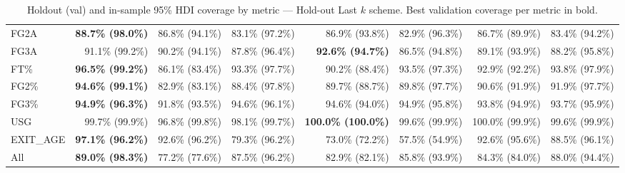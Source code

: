 \begin{table}[H]
{\begin{tabular}{lrrrrrrr}
FG2A & \textbf{88.7\% (98.0\%)} & 86.8\% (94.1\%) & 83.1\% (97.2\%) & 86.9\% (93.8\%) & 82.9\% (96.3\%) & 86.7\% (89.9\%) & 83.4\% (94.2\%) \\
FG3A & 91.1\% (99.2\%) & 90.2\% (94.1\%) & 87.8\% (96.4\%) & \textbf{92.6\% (94.7\%)} & 86.5\% (94.8\%) & 89.1\% (93.9\%) & 88.2\% (95.8\%) \\
FT\% & \textbf{96.5\% (99.2\%)} & 86.1\% (83.4\%) & 93.3\% (97.7\%) & 90.2\% (88.4\%) & 93.5\% (97.3\%) & 92.9\% (92.2\%) & 93.8\% (97.9\%) \\
FG2\% & \textbf{94.6\% (99.1\%)} & 82.9\% (83.1\%) & 88.4\% (97.8\%) & 89.7\% (88.7\%) & 89.8\% (97.7\%) & 90.6\% (91.9\%) & 91.9\% (97.7\%) \\
FG3\% & \textbf{94.9\% (96.3\%)} & 91.8\% (93.5\%) & 94.6\% (96.1\%) & 94.6\% (94.0\%) & 94.9\% (95.8\%) & 93.8\% (94.9\%) & 93.7\% (95.9\%) \\
USG & 99.7\% (99.9\%) & 96.8\% (99.8\%) & 98.1\% (99.7\%) & \textbf{100.0\% (100.0\%)} & 99.6\% (99.9\%) & 100.0\% (99.9\%) & 99.6\% (99.9\%) \\
EXIT\_AGE & \textbf{97.1\% (96.2\%)} & 92.6\% (96.2\%) & 79.3\% (96.2\%) & 73.0\% (72.2\%) & 57.5\% (54.9\%) & 92.6\% (95.6\%) & 88.5\% (96.1\%) \\
\midrule
All & \textbf{89.0\% (98.3\%)} & 77.2\% (77.6\%) & 87.5\% (96.2\%) & 82.9\% (82.1\%) & 85.8\% (93.9\%) & 84.3\% (84.0\%) & 88.0\% (94.4\%) \\
\bottomrule
\end{tabular}
}
\caption{Holdout (val) and in-sample 95\% HDI coverage by metric --- Hold-out Last $k$ scheme. Best validation coverage per metric in bold.}
\label{tab:hdi_coverage_holdout_last_k}
\end{table}

